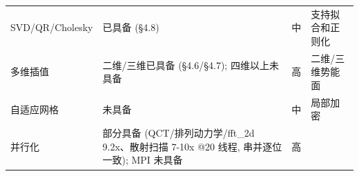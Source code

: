 \documentclass[
]{ctexbook}
\begin{document}
\begin{longtable}[]{@{}llll@{}}
\begin{minipage}[t]{0.22\columnwidth}\raggedright
SVD/QR/Cholesky\strut
\end{minipage} & \begin{minipage}[t]{0.22\columnwidth}\raggedright
已具备 (§4.8)\strut
\end{minipage} & \begin{minipage}[t]{0.22\columnwidth}\raggedright
中\strut
\end{minipage} & \begin{minipage}[t]{0.22\columnwidth}\raggedright
支持拟合和正则化\strut
\end{minipage}\tabularnewline
\begin{minipage}[t]{0.22\columnwidth}\raggedright
多维插值\strut
\end{minipage} & \begin{minipage}[t]{0.22\columnwidth}\raggedright
二维/三维已具备 (§4.6/§4.7); 四维以上未具备\strut
\end{minipage} & \begin{minipage}[t]{0.22\columnwidth}\raggedright
高\strut
\end{minipage} & \begin{minipage}[t]{0.22\columnwidth}\raggedright
二维/三维势能面\strut
\end{minipage}\tabularnewline
\begin{minipage}[t]{0.22\columnwidth}\raggedright
自适应网格\strut
\end{minipage} & \begin{minipage}[t]{0.22\columnwidth}\raggedright
未具备\strut
\end{minipage} & \begin{minipage}[t]{0.22\columnwidth}\raggedright
中\strut
\end{minipage} & \begin{minipage}[t]{0.22\columnwidth}\raggedright
局部加密\strut
\end{minipage}\tabularnewline
\begin{minipage}[t]{0.22\columnwidth}\raggedright
并行化\strut
\end{minipage} & \begin{minipage}[t]{0.22\columnwidth}\raggedright
部分具备 (QCT/排列动力学/fft\_2d 9.2x、散射扫描 7-10x @20 线程,
串并逐位一致); MPI 未具备\strut
\end{minipage} & \begin{minipage}[t]{0.22\columnwidth}\raggedright
高\strut
\end{minipage} & \begin{minipage}[t]{0.22\columnwidth}\raggedright

\end{minipage}
\end{longtable}
\end{document}
